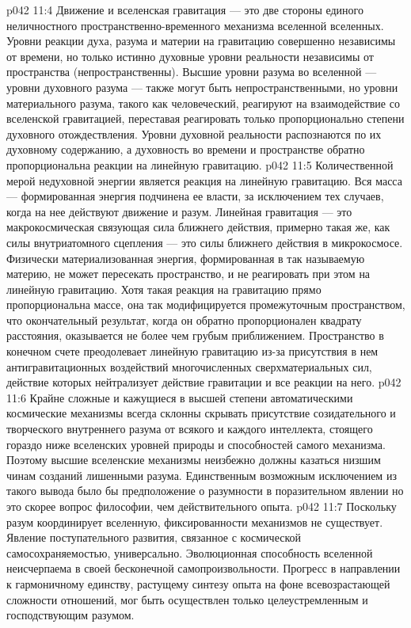 \vs p042 11:4 \pc Движение и вселенская гравитация --- это две стороны единого неличностного пространственно\hyp{}временного механизма вселенной вселенных. Уровни реакции духа, разума и материи на гравитацию совершенно независимы от времени, но только истинно духовные уровни реальности независимы от пространства (непространственны). Высшие уровни разума во вселенной --- уровни духовного разума --- также могут быть непространственными, но уровни материального разума, такого как человеческий, реагируют на взаимодействие со вселенской гравитацией, переставая реагировать только пропорционально степени духовного отождествления. Уровни духовной реальности распознаются по их духовному содержанию, а духовность во времени и пространстве обратно пропорциональна реакции на линейную гравитацию.
\vs p042 11:5 Количественной мерой недуховной энергии является реакция на линейную гравитацию. Вся масса --- формированная энергия подчинена ее власти, за исключением тех случаев, когда на нее действуют движение и разум. Линейная гравитация --- это макрокосмическая связующая сила ближнего действия, примерно такая же, как силы внутриатомного сцепления --- это силы ближнего действия в микрокосмосе. Физически материализованная энергия, формированная в так называемую материю, не может пересекать пространство, и не реагировать при этом на линейную гравитацию. Хотя такая реакция на гравитацию прямо пропорциональна массе, она так модифицируется промежуточным пространством, что окончательный результат, когда он обратно пропорционален квадрату расстояния, оказывается не более чем грубым приближением. Пространство в конечном счете преодолевает линейную гравитацию из\hyp{}за присутствия в нем антигравитационных воздействий многочисленных сверхматериальных сил, действие которых нейтрализует действие гравитации и все реакции на него.
\vs p042 11:6 \pc Крайне сложные и кажущиеся в высшей степени автоматическими космические механизмы всегда склонны скрывать присутствие созидательного и творческого внутреннего разума от всякого и каждого интеллекта, стоящего гораздо ниже вселенских уровней природы и способностей самого механизма. Поэтому высшие вселенские механизмы неизбежно должны казаться низшим чинам созданий лишенными разума. Единственным возможным исключением из такого вывода было бы предположение о разумности в поразительном явлении  но это скорее вопрос философии, чем действительного опыта.
\vs p042 11:7 Поскольку разум координирует вселенную, фиксированности механизмов не существует. Явление поступательного развития, связанное с космической самосохраняемостью, универсально. Эволюционная способность вселенной неисчерпаема в своей бесконечной самопроизвольности. Прогресс в направлении к гармоничному единству, растущему синтезу опыта на фоне всевозрастающей сложности отношений, мог быть осуществлен только целеустремленным и господствующим разумом.

